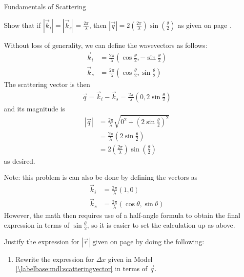 \begin{activity}{Fundamentals of Scattering}
\begin{exercises}
\begin{enumerate}
\begin{solution}{}
				\end{solution}
			
			
		\end{enumerate}
	
	\exercise Show that if $|\vec k_i| = |\vec k_s| = \frac{2\pi}{\lambda}$, then $|\vec q| = 2\left(\frac{2\pi}{\lambda}\right)\sin\left(\frac{\theta}{2}\right)$ as given on page \pageref{\labelbase:ctq:magq}. \label{\labelbase:ctq:magq}
	
		\begin{solution}{}
			Without loss of generality, we can define the wavevectors as follows:
			\begin{align*}
				\vec k_i &= \frac{2\pi}{\lambda}(\cos\frac{\theta}{2},-\sin\frac{\theta}{2})\\
				\vec k_s &= \frac{2\pi}{\lambda}(\cos\frac{\theta}{2},\sin\frac{\theta}{2})
			\end{align*}
			The scattering vector is then
			\begin{align*}
				\vec q = \vec k_i - \vec k_s = \frac{2\pi}{\lambda}(0,2\sin\frac{\theta}{2})
			\end{align*}
			and its magnitude is
			\begin{align*}
				|\vec q| &= \frac{2\pi}{\lambda}\sqrt{ 0^2 + \left(2\sin\frac{\theta}{2}\right)^2}\\
				&= \frac{2\pi}{\lambda}\left(2\sin\frac{\theta}{2}\right)\\
				&= 2\left(\frac{2\pi}{\lambda}\right)\sin\left(\frac{\theta}{2}\right)
			\end{align*}
			as desired.
			
			Note: this problem is can also be done by defining the vectors as 
			\begin{align*}
				\vec k_i &= \frac{2\pi}{\lambda}(1,0)\\
				\vec k_s &= \frac{2\pi}{\lambda}(\cos\theta,\sin\theta)
			\end{align*}
			However, the math then requires use of a half-angle formula to obtain the final expression in terms of $\sin\frac{\theta}{2}$, so it is easier to set the calculation up as above.
		\end{solution}
	
	\exercise Justify the expression for $|\vec r|$ given on page \pageref{\labelbase:eqn:rq} by doing the following: \label{\labelbase:exc:rq}
	
		\begin{enumerate}
			\item Rewrite the expression for $\Delta x$ given in Model \ref{\labelbase:mdl:scatteringvector} in terms of $\vec q$.
			

\end{enumerate}
\end{exercises}
\end{activity}
